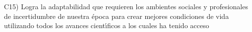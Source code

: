 C15) Logra la adaptabilidad que requieren los ambientes sociales y
profesionales de incertidumbre de nuestra \'{e}poca para crear mejores
condiciones de vida utilizando todos los avances cient\'{\i}ficos a los
cuales ha tenido acceso
